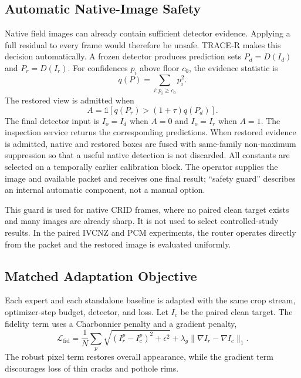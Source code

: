 \documentclass[journal]{IEEEtran}
\begin{document}
\subsection{Automatic Native-Image Safety}
Native field images can already contain sufficient detector evidence. Applying a full residual to every frame would therefore be unsafe. TRACE-R makes this decision automatically. A frozen detector produces prediction sets $P_d=D(I_d)$ and $P_r=D(I_r)$. For confidences $p_i$ above floor $c_0$, the evidence statistic is
\begin{equation}
q(P)=\sum_{i:p_i\ge c_0}p_i^2.
\label{eq:evidence}
\end{equation}
The restored view is admitted when
\begin{equation}
A=\mathbb{1}\!\left[q(P_r)>(1+\tau)q(P_d)\right].
\label{eq:guard}
\end{equation}
The final detector input is $I_o=I_d$ when $A=0$ and $I_o=I_r$ when $A=1$. The inspection service returns the corresponding predictions. When restored evidence is admitted, native and restored boxes are fused with same-family non-maximum suppression so that a useful native detection is not discarded. All constants are selected on a temporally earlier calibration block. The operator supplies the image and available packet and receives one final result; ``safety guard'' describes an internal automatic component, not a manual option.

This guard is used for native CRID frames, where no paired clean target exists and many images are already sharp. It is not used to select controlled-study results. In the paired IVCNZ and PCM experiments, the router operates directly from the packet and the restored image is evaluated uniformly.

\subsection{Matched Adaptation Objective}
Each expert and each standalone baseline is adapted with the same crop stream, optimizer-step budget, detector, and loss. Let $I_c$ be the paired clean target. The fidelity term uses a Charbonnier penalty and a gradient penalty,
\begin{equation}
\mathcal{L}_{\mathrm{fid}}
=\frac{1}{N}\sum_p\sqrt{(I_r^p-I_c^p)^2+\epsilon^2}
+\lambda_g\|\nabla I_r-\nabla I_c\|_1.
\label{eq:fidelityloss}
\end{equation}
The robust pixel term restores overall appearance, while the gradient term discourages loss of thin cracks and pothole rims.
\end{document}
